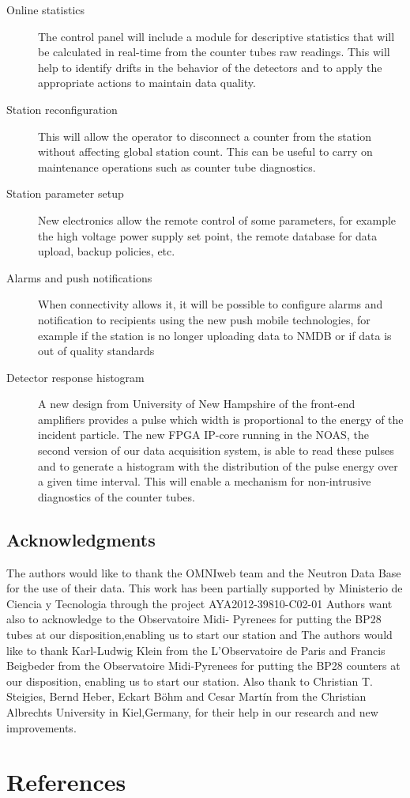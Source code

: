 \documentclass[a4paper]{jpconf}
\begin{document}
\begin{description}
    \item[Online statistics] The control panel will include a module for
        descriptive statistics that will be calculated in real-time from the
        counter tubes raw readings. This will help to identify drifts in the
        behavior of the detectors and to apply the appropriate actions to
        maintain data quality.
    \item[Station reconfiguration] This will allow the operator to disconnect a
        counter from the station without affecting global station count. This
        can be useful to carry on maintenance operations such as counter tube
        diagnostics. 
    \item[Station parameter setup] New electronics allow the remote control of
        some parameters, for example the high voltage power supply set point,
        the remote database for data upload, backup policies, etc.
    \item[Alarms and push notifications] When connectivity allows it, it will
        be possible to configure alarms and notification to recipients using
        the new push mobile technologies, for example if the station is no
        longer uploading data to NMDB or if data is out of quality standards
    \item[Detector response histogram] A new design from University of New
      	Hampshire of the front-end amplifiers provides a pulse which
        width is proportional to the energy of the incident particle. The new
        FPGA IP-core running in the NOAS, the second version of our data
        acquisition system, is able to read these pulses and to generate a
        histogram with the distribution of the pulse energy over a given time
        interval. This will enable a mechanism for non-intrusive diagnostics of
        the counter tubes. 
\end{description}


\subsection*{Acknowledgments} 

The authors would like to thank the OMNIweb team and the Neutron Data Base for
the use of their data. This work has been partially supported by Ministerio de
Ciencia y Tecnologia through the project AYA2012-39810-C02-01 Authors want also
to acknowledge to the Observatoire Midi- Pyrenees for putting the BP28 tubes at
our disposition,enabling us to start our station and The authors would like to
thank Karl-Ludwig Klein from the L’Observatoire de Paris and Francis Beigbeder
from the Observatoire Midi-Pyrenees for putting the BP28 counters at our
disposition, enabling us to start our station. Also thank to Christian T.
Steigies, Bernd Heber, Eckart Böhm and Cesar Martín from the Christian
Albrechts University in Kiel,Germany, for their help in our research and new
improvements.


\section*{References}
 
\end{document}
